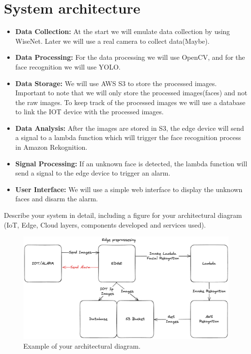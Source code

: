 \documentclass[conference]{IEEEtran}
\begin{document}
\section{System architecture}
\begin{itemize}
    \item \textbf{Data Collection:} At the start we will emulate data collection by using WiseNet. Later we will use a real camera to collect data(Maybe).
    \item \textbf{Data Processing:} For the data processing we will use OpenCV, and for the face recognition we will use YOLO.
    \item \textbf{Data Storage:} We will use AWS S3 to store the processed images. Important to note that we will only store the processed images(faces) and not the raw images. To keep 
            track of the processed images we will use a database to link the IOT device with the processed images.
    \item \textbf{Data Analysis:} After the images are stored in S3, the edge device will send a signal to a lambda function which will trigger the face recognition process in Amazon Rekognition.
    \item \textbf{Signal Processing:} If an unknown face is detected, the lambda function will send a signal to the edge device to trigger an alarm.  
    \item \textbf{User Interface:} We will use a simple web interface to display the unknown faces and disarm the alarm. 
\end{itemize}
Describe your system in detail, including a figure for your architectural diagram (IoT, Edge, Cloud layers, components developed and services used).

\begin{figure}[h!]
    \centering
    \includegraphics[width=1\linewidth]{images/architecture.excalidraw.png}
    \caption{Example of your architectural diagram.}
    \label{fig:enter-label}
\end{figure}
\end{document}
